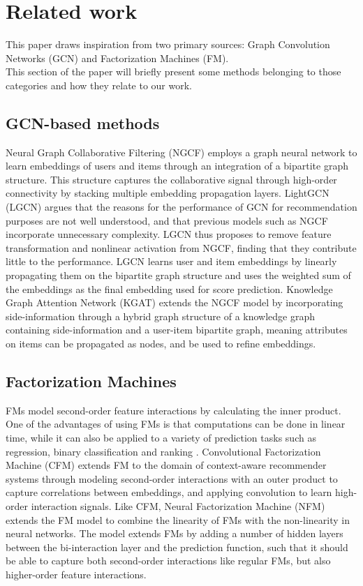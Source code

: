 \section{Related work}\label{sec:relatedwork}
This paper draws inspiration from two primary sources: Graph Convolution Networks (GCN) and Factorization Machines (FM).\\
This section of the paper will briefly present some methods belonging to those categories and how they relate to our work.

\subsection{GCN-based methods}
Neural Graph Collaborative Filtering (NGCF) \cite{NGCF} employs a graph neural network to learn embeddings of users and items through an integration of a bipartite graph structure.
This structure captures the collaborative signal through high-order connectivity by stacking multiple embedding propagation layers.
LightGCN (LGCN) \cite{LightGCN} argues that the reasons for the performance of GCN for recommendation purposes are not well understood, and that previous models such as NGCF incorporate unnecessary complexity.
LGCN thus proposes to remove feature transformation and nonlinear activation from NGCF, finding that they contribute little to the performance.
LGCN learns user and item embeddings by linearly propagating them on the bipartite graph structure and uses the weighted sum of the embeddings as the final embedding used for score prediction.
Knowledge Graph Attention Network (KGAT) \cite{KGAT} extends the NGCF model by incorporating side-information through a hybrid graph structure of a knowledge graph containing side-information and a user-item bipartite graph, meaning attributes on items can be propagated as nodes, and be used to refine embeddings.

\subsection{Factorization Machines}
FMs \cite{fmrendle} model second-order feature interactions by calculating the inner product.
One of the advantages of using FMs is that computations can be done in linear time, while it can also be applied to a variety of prediction tasks such as regression, binary classification and ranking \cite{fmrendle}.
Convolutional Factorization Machine (CFM) \cite{CFM} extends FM to the domain of context-aware recommender systems through modeling second-order interactions with an outer product to capture correlations between embeddings, and applying convolution to learn high-order interaction signals.
Like CFM, Neural Factorization Machine (NFM) \cite{NeuralFM} extends the FM model to combine the linearity of FMs with the non-linearity in neural networks.
The model extends FMs by adding a number of hidden layers between the bi-interaction layer and the prediction function, such that it should be able to capture both second-order interactions like regular FMs, but also higher-order feature interactions. 

